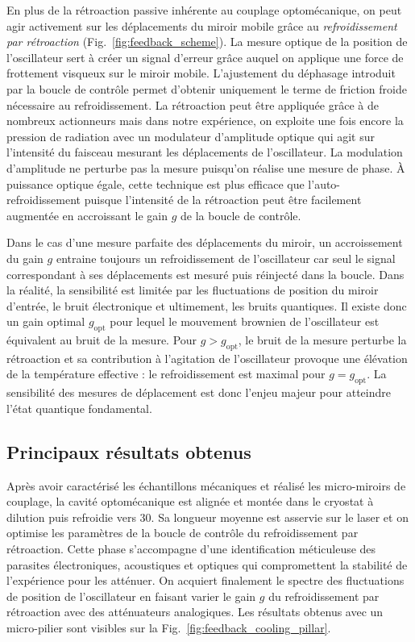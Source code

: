 \documentclass[12pt,a4paper]{article}
\begin{document}
En plus de la rétroaction passive inhérente au couplage optomécanique, on peut agir activement sur les déplacements du miroir mobile grâce au \emph{refroidissement par rétroaction} (Fig.~\ref{fig:feedback_scheme}).
La mesure optique de la position de l'oscillateur sert à créer un signal d'erreur grâce auquel on applique une force de frottement visqueux sur le miroir mobile.
L'ajustement du déphasage introduit par la boucle de contrôle permet d'obtenir uniquement le terme de friction froide nécessaire au refroidissement.
La rétroaction peut être appliquée grâce à de nombreux actionneurs mais dans notre expérience, on exploite une fois encore la pression de radiation avec un modulateur d'amplitude optique qui agit sur l'intensité du faisceau mesurant les déplacements de l'oscillateur.
La modulation d'amplitude ne perturbe pas la mesure puisqu'on réalise une mesure de phase. 
À puissance optique égale, cette technique est plus efficace que l'auto-refroidissement puisque l'intensité de la rétroaction peut être facilement augmentée en accroissant le gain $g$ de la boucle de contrôle.

Dans le cas d'une mesure parfaite des déplacements du miroir, un accroissement du gain $g$ entraine toujours un refroidissement de l'oscillateur car seul le signal correspondant à ses déplacements est mesuré puis réinjecté dans la boucle.
Dans la réalité, la sensibilité est limitée par les fluctuations de position du miroir d'entrée, le bruit électronique et ultimement, les bruits quantiques.
Il existe donc un gain optimal $g_\mathrm{opt}$ pour lequel le mouvement brownien de l'oscillateur est équivalent au bruit de la mesure.
Pour $g>g_\mathrm{opt}$, le bruit de la mesure perturbe la rétroaction et sa contribution à l'agitation de l'oscillateur provoque une élévation de la température effective : le refroidissement est maximal pour $g=g_\mathrm{opt}$.
La sensibilité des mesures de déplacement est donc l'enjeu majeur pour atteindre l'état quantique fondamental.

\subsection{Principaux résultats obtenus}
\label{sec:results}

Après avoir caractérisé les échantillons mécaniques et réalisé les micro-miroirs de couplage, la cavité optomécanique est alignée et montée dans le cryostat à dilution puis refroidie vers \unit{30}{\milli\kelvin}.
Sa longueur moyenne est asservie sur le laser et on optimise les paramètres de la boucle de contrôle du refroidissement par rétroaction.
Cette phase s'accompagne d'une identification méticuleuse des parasites électroniques, acoustiques et optiques qui compromettent la stabilité de l'expérience pour les atténuer.
On acquiert finalement le spectre des fluctuations de position de l'oscillateur en faisant varier le gain $g$ du refroidissement par rétroaction avec des atténuateurs analogiques.
Les résultats obtenus avec un micro-pilier sont visibles sur la Fig.~\ref{fig:feedback_cooling_pillar}.
\end{document}
